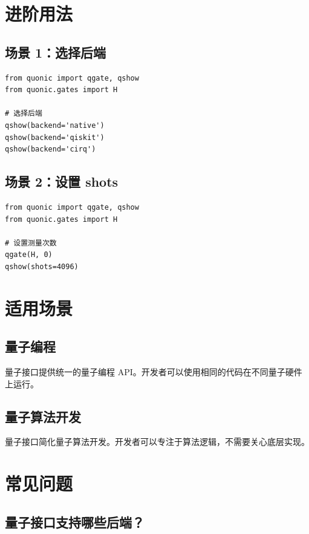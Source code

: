 \documentclass[12pt,a4paper]{article}
\begin{document}
\section{进阶用法}

\subsection{场景 1：选择后端}

\begin{verbatim}
from quonic import qgate, qshow
from quonic.gates import H

# 选择后端
qshow(backend='native')
qshow(backend='qiskit')
qshow(backend='cirq')
\end{verbatim}

\subsection{场景 2：设置 shots}

\begin{verbatim}
from quonic import qgate, qshow
from quonic.gates import H

# 设置测量次数
qgate(H, 0)
qshow(shots=4096)
\end{verbatim}

\section{适用场景}

\subsection{量子编程}

量子接口提供统一的量子编程 API。开发者可以使用相同的代码在不同量子硬件上运行。

\subsection{量子算法开发}

量子接口简化量子算法开发。开发者可以专注于算法逻辑，不需要关心底层实现。

\section{常见问题}

\subsection{量子接口支持哪些后端？}
\end{document}
